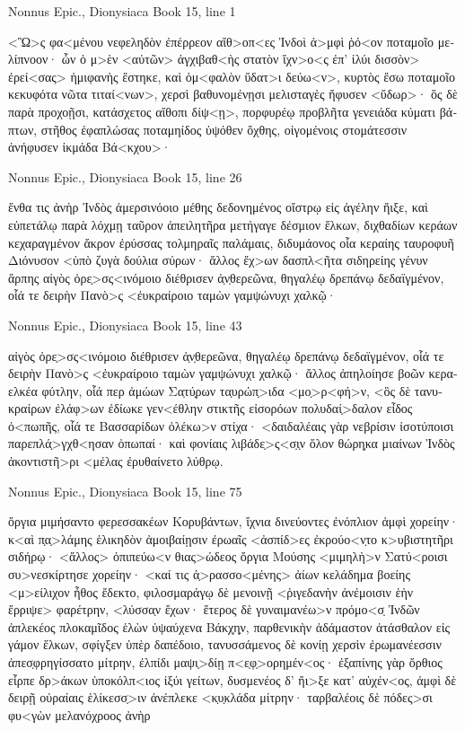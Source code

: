 \documentclass[12pt,letterpaper,twoside,final]{memoir}
\begin{document}
\begin{greek}
Nonnus Epic., Dionysiaca 
Book 15, line 1

<Ὣ>ς φα<μένου νεφεληδὸν ἐπέρρεον αἴθ>οπ<ες Ἰνδοὶ 
ἀ>μφὶ ῥό<ον ποταμοῖο μελίπνοον· ὧν ὁ μ>ὲν <αὐτῶν> 
ἀγχιβαθ<ὴς στατὸν ἴχν>ο<ς ἐπ' ἰλύι δισσὸν> ἐρεί<σας> 
ἡμιφανὴς ἕστηκε, καὶ ὀμ<φαλὸν ὕδατ>ι δεύω<ν>, 
κυρτὸς ἔσω ποταμοῖο κεκυφότα νῶτα τιταί<νων>, 
χερσὶ βαθυνομένῃσι μελισταγὲς ἤφυσεν <ὕδωρ>· 
ὃς δὲ παρὰ προχοῇσι, κατάσχετος αἴθοπι δίψ<ῃ>, 
πορφυρέῳ προβλῆτα γενειάδα κύματι βάπτων, 
στῆθος ἐφαπλώσας ποταμηίδος ὑψόθεν ὄχθης, 
οἰγομένοις στομάτεσσιν ἀνήφυσεν ἰκμάδα Βά<κχου>· 




Nonnus Epic., Dionysiaca 
Book 15, line 26

                                         ἔνθα τις ἀνὴρ 
Ἰνδὸς ἀμερσινόοιο μέθης δεδονημένος οἴστρῳ 
εἰς ἀγέλην ἤιξε, καὶ εὐπετάλῳ παρὰ λόχμῃ 
ταῦρον ἀπειλητῆρα μετήγαγε δέσμιον ἕλκων, 
διχθαδίων κεράων κεχαραγμένον ἄκρον ἐρύσσας 
τολμηραῖς παλάμαις, διδυμάονος οἷα κεραίης 
ταυροφυῆ Διόνυσον <ὑπὸ ζυγὰ δούλια σύρων· 
ἄλλος ἔχ>ων δασπλ<ῆτα σιδηρείης γένυν ἅρπης 
αἰγὸς ὀρε̣>σς<ινόμοιο διέθρισεν ἀ̣ν̣θερεῶνα, 
θηγαλέῳ δρεπάνῳ δεδαϊγμένον, οἷά τε δειρὴν 
Πανὸ>ς <ἐυκραίροιο ταμὼν γαμψώνυχι χαλκῷ· 




Nonnus Epic., Dionysiaca 
Book 15, line 43

αἰγὸς ὀρε̣>σς<ινόμοιο διέθρισεν ἀ̣ν̣θερεῶνα, 
θηγαλέῳ δρεπάνῳ δεδαϊγμένον, οἷά τε δειρὴν 
Πανὸ>ς <ἐυκραίροιο ταμὼν γαμψώνυχι χαλκῷ· 
ἄλλος ἀπηλοίησε βοῶν κεραελκέα φύτλην, 
οἷά περ ἀμώων Σα̣τύ̣ρων τα̣υρώπ̣>ιδα <μο̣>ρ<φή>ν,   
<ὃς δὲ τανυκραίρων ἐλάφ>ων ἐδίωκε γεν<έθλην 
στικτῆς εἰσορόων πολυδαί̣>δαλον εἶδος ὀ<πωπῆς, 
οἷά τε Βασσαρίδων ὀλέκω>ν στίχα· <δαιδαλέαις γὰρ 
νεβρίσιν ἰσοτύποισι παρεπλά̣>γχθ<ησαν ὀπωπαί· 
καὶ φονίαις λιβάδε̣>ς<σ̣ι̣ν ὅλον θώρη̣κα μιαίνων 
Ἰνδὸς ἀκοντιστῆ>ρι <μέλας ἐρυθαίνετο λύθρῳ. 



Nonnus Epic., Dionysiaca 
Book 15, line 75

ὄργια μιμήσαντο φερεσσακέων Κορυβάντων, 
ἴχνια δινεύοντες ἐνόπλιον ἀμφὶ χορείην· 
κ<αὶ π̣α̣>λάμης ἑλικηδὸν ἀμοιβαίῃσιν ἐρωαῖς 
<ἀσπίδ>ες ἐκρούο<ν̣το κ>υβιστητῆρι σιδήρῳ· 
<ἄλλος> ὀπιπεύω<ν θιας>ώδεος ὄργια Μούσης 
<μιμηλὴ>ν Σατύ<ροισι συ>νεσκίρτησε χορείην· 
<καί τις ἀ̣>ρασσο<μένης> ἀίων κελάδημα βοείης 
<μ>είλιχον ἦθος ἔδεκτο, φιλοσμαράγῳ δὲ μενοινῇ 
<ῥιγεδανὴν ἀνέμοισιν ἑὴν ἔρριψε> φαρέτρην, 
<λύσσα̣ν ἔχων· ἕτερος δὲ γυναιμανέω>ν πρόμο<σ̣ Ἰνδῶν   
ἀπλεκέος πλοκαμῖδος ἑλὼν ὑψαύχενα Βάκχ̣η̣ν, 
παρθενικὴν ἀδάμαστον ἀτάσθαλον εἰς γάμον ἕλκων, 
σφίγξεν ὑπὲρ δαπέδοιο, τανυσσάμενος δὲ κονίῃ 
χερσὶν ἐρωμανέεσσιν ἀπεσ̣φρηγίσσατο μίτρην, 
ἐλπίδι μαψι̣>δίῃ π<ε̣φ̣>ορημέν<ος· ἐξαπίνης γὰρ 
ὄρθιος εἷρπε δρ>άκων ὑποκόλπ<ιος ἰξύι γείτων, 
δυσμενέος δ' ἤι>ξε κατ' αὐχέν<ος, ἀμφὶ δὲ δειρῇ 
οὐραίαις ἑλίκεσσ̣>ιν ἀνέπλεκε <κ̣υ̣κλάδα μίτρην· 
ταρβαλέοις δὲ πόδες>σι φυ<γὼν μελανόχροος ἀνὴρ 





\end{greek}
\end{document}
